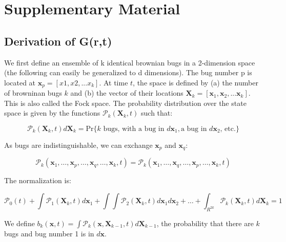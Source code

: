 \section*{Supplementary Material}
\subsection*{Derivation of G(r,t)}

We first define an ensemble of k identical brownian bugs in a 2-dimension
space (the following can easily be generalized to d dimensions). The
bug number p is located at $\boldsymbol{x}_{p}=[x1,x2,...x_{k}]$.
At time $t$, the space is defined by (a) the number of browninan
bugs $k$ and (b) the vector of their locations $\boldsymbol{X}_{k}=[\boldsymbol{x}_{1},\boldsymbol{x}_{2},...\boldsymbol{x}_{k}]$.
This is also called the Fock space. The probability distribution over
the state space is given by the functions $\mathcal{P}_{k}(\boldsymbol{X}_{k},t)$
such that:

\begin{equation}
\mathcal{P}_{k}(\boldsymbol{X}_{k},t)d\boldsymbol{X}_{k}=\text{Pr}\{k\text{ bugs, with a bug in }d\boldsymbol{x}_{1},\text{a bug in }d\boldsymbol{x}_{2}\text{, etc.}\}
\end{equation}

As bugs are indistinguishable, we can exchange $\boldsymbol{x}_{p}$
and $\boldsymbol{x}_{q}$:

\begin{equation}
\mathcal{P}_{k}(\boldsymbol{x}_{1},\ldots,\boldsymbol{x}_{p},\ldots,\boldsymbol{x}_{q},\ldots,\boldsymbol{x}_{k},t)=\mathcal{P}_{k}(\boldsymbol{x}_{1},\ldots,\boldsymbol{x}_{q},\ldots,\boldsymbol{x}_{p},\ldots,\boldsymbol{x}_{k},t)
\end{equation}

The normalization is: 

\begin{equation}
\mathcal{P}_{0}(t)+\int\mathcal{P}_{1}(\boldsymbol{X}_{k},t)d\boldsymbol{x}_{1}+\int\int\mathcal{P}_{2}(\boldsymbol{X}_{k},t)d\boldsymbol{x}_{1}d\boldsymbol{x}_{2}+\ldots+\int_{R^{2k}}\mathcal{P}_{k}(\boldsymbol{X}_{k},t)d\boldsymbol{X}_{k}=1
\end{equation}

We define $b_{k}(\mathbf{x},t)=\int\mathcal{P}_{k}(\boldsymbol{x},\boldsymbol{X}_{k-1},t)d\boldsymbol{X}_{k-1}$,
the probability that there are $k$ bugs and bug number 1 is in $d\boldsymbol{x}$.\\

